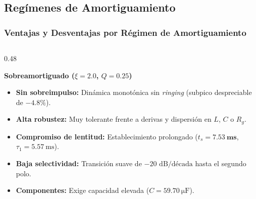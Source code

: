 \documentclass[aspectratio=169, 10pt]{beamer}
\begin{document}
\subsection{Regímenes de Amortiguamiento}
\begin{frame}
  \frametitle{Ventajas y Desventajas por Régimen de Amortiguamiento}

  \begin{columns}[t, onlytextwidth]
    \begin{column}{0.48\textwidth}
      \begin{tarjeta}
        {\fontsize{8.5pt}{10.5pt}\selectfont \textbf{\color{NavyDark} Sobreamortiguado ($\xi = 2.0$, $Q = 0.25$)}}\\[2pt]
        {\fontsize{7.5pt}{9.5pt}\selectfont
        \begin{itemize}\setlength{\itemsep}{2pt}
          \item \textbf{Sin sobreimpulso:} Dinámica monotónica sin \emph{ringing} (subpico despreciable de $\mathbf{-4.8\%}$).
          \item \textbf{Alta robustez:} Muy tolerante frente a derivas y dispersión en $L$, $C$ o $R_g$.
          \item \textbf{Compromiso de lentitud:} Establecimiento prolongado ($t_s = \mathbf{\qty{7.53}{\milli\second}}$, $\tau_1 = \qty{5.57}{\milli\second}$).
          \item \textbf{Baja selectividad:} Transición suave de $-20\text{ dB/década}$ hasta el segundo polo.
          \item \textbf{Componentes:} Exige capacidad elevada ($C = \qty{59.70}{\micro\farad}$).
        \end{itemize}
        }
      \end{tarjeta}
    \end{column}


\end{columns}
\end{frame}
\end{document}
